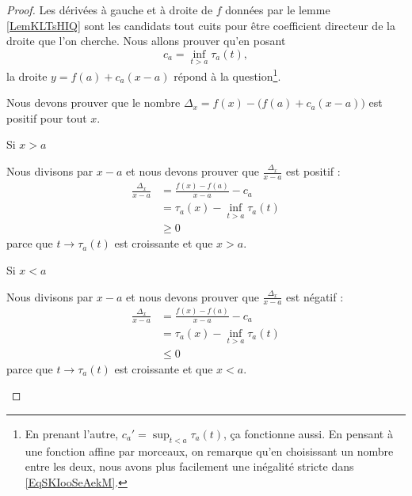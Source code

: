 \begin{proof}
    Les dérivées à gauche et à droite de \( f\) données par le lemme \ref{LemKLTsHIQ} sont les candidats tout cuits pour être coefficient directeur de la droite que l'on cherche. Nous allons prouver qu'en posant
    \begin{equation}
        c_a=\inf_{t>a}\tau_a(t),
    \end{equation}
    la droite \( y=f(a)+c_a(x-a)\) répond à la question\footnote{En prenant l'autre, \( c_a'=\sup_{t<a}\tau_a(t)\), ça fonctionne aussi. En pensant à une fonction affine par morceaux, on remarque qu'en choisissant un nombre entre les deux, nous avons plus facilement une inégalité stricte dans \eqref{EqSKIooSeAekM}.}.

    Nous devons prouver que le nombre \( \Delta_x=f(x)-\big( f(a)+c_a(x-a) \big)\) est positif pour tout \( x\).
    \begin{subproof}

    \item[Si \( x>a\)]
        
        Nous divisons par \( x-a\) et nous devons prouver que \( \frac{ \Delta_x }{ x-a }\) est positif :
        \begin{subequations}
            \begin{align}
                \frac{ \Delta_x }{ x-a }&=\frac{ f(x)-f(a) }{ x-a }-c_a\\
                &=\tau_a(x)-\inf_{t>a}\tau_a(t)\\
                &\geq 0
            \end{align}
        \end{subequations}
        parce que \( t\to\tau_a(t)\) est croissante et que \( x>a\).

    \item[Si \( x<a\)]
        
        Nous divisons par \( x-a\) et nous devons prouver que \( \frac{ \Delta_x }{ x-a }\) est négatif :
        \begin{subequations}
            \begin{align}
                \frac{ \Delta_x }{ x-a }&=\frac{ f(x)-f(a) }{ x-a }-c_a\\
                &=\tau_a(x)-\inf_{t>a}\tau_a(t)\\
                &\leq 0
            \end{align}
        \end{subequations}
        parce que \( t\to\tau_a(t)\) est croissante et que \( x<a\).
    \end{subproof}
\end{proof}

